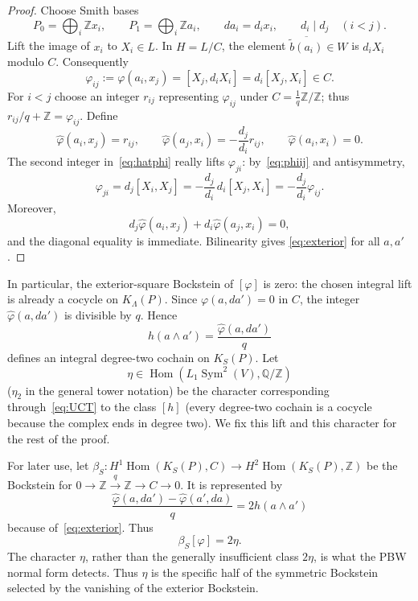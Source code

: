 \documentclass[11pt]{amsart}
\theoremstyle{remark}
\newcommand{\Z}{\mathbb Z}
\newcommand{\Q}{\mathbb Q}
\newcommand{\Sym}{\operatorname{Sym}}
\newcommand{\Hom}{\operatorname{Hom}}
\begin{document}
\begin{proof}
Choose Smith bases
\[
 P_0=\bigoplus_i\Z x_i,
 \qquad P_1=\bigoplus_i\Z a_i,
 \qquad da_i=d_ix_i,
 \qquad d_i\mid d_j\quad(i<j).
\]
Lift the image of $x_i$ to $X_i\in L$.  In $H=L/C$, the element
$\overline{\widetilde b(a_i)}\in W$ is $d_iX_i$ modulo $C$.
Consequently
\begin{equation}\label{eq:phiij}
 \varphi_{ij}:=\varphi(a_i,x_j)
   =[X_j,d_iX_i]=d_i[X_j,X_i]\in C.
\end{equation}
For $i<j$ choose an integer $r_{ij}$ representing $\varphi_{ij}$ under
$C=\frac1q\Z/\Z$; thus
$r_{ij}/q+\Z=\varphi_{ij}$.  Define
\begin{equation}\label{eq:hatphi}
 \widehat\varphi(a_i,x_j)=r_{ij},
 \qquad
 \widehat\varphi(a_j,x_i)=-\frac{d_j}{d_i}r_{ij},
 \qquad
 \widehat\varphi(a_i,x_i)=0.
\end{equation}
The second integer in~\eqref{eq:hatphi} really lifts
$\varphi_{ji}$: by~\eqref{eq:phiij} and antisymmetry,
\[
 \varphi_{ji}=d_j[X_i,X_j]
   =-\frac{d_j}{d_i}\,d_i[X_j,X_i]
   =-\frac{d_j}{d_i}\varphi_{ij}.
\]
Moreover,
\[
 d_j\widehat\varphi(a_i,x_j)
 +d_i\widehat\varphi(a_j,x_i)=0,
 \]
and the diagonal equality is immediate.  Bilinearity gives
\eqref{eq:exterior} for all $a,a'$.
\end{proof}

In particular, the exterior-square Bockstein of $[\varphi]$ is zero:
the chosen integral lift is already a cocycle on $K_\Lambda(P)$.
Since $\varphi(a,da')=0$ in $C$, the integer
$\widehat\varphi(a,da')$ is divisible by $q$.  Hence
\begin{equation}\label{eq:h}
 h(a\wedge a')=\frac{\widehat\varphi(a,da')}{q}
\end{equation}
defines an integral degree-two cochain on $K_S(P)$.  Let
\begin{equation}\label{eq:eta}
 \eta\in\Hom(L_1\Sym^2(V),\Q/\Z)
\end{equation}
($\eta_2$ in the general tower notation) be the character
corresponding through~\eqref{eq:UCT} to the class
$[h]$ (every degree-two cochain is a cocycle because the complex ends
in degree two).  We fix this lift and this character for the rest of
the proof.

For later use, let
$\beta_S:H^1\Hom(K_S(P),C)\to H^2\Hom(K_S(P),\Z)$ be the Bockstein for
$0\to\Z\xrightarrow q\Z\to C\to0$.  It is represented by
\[
 \frac{\widehat\varphi(a,da')-
       \widehat\varphi(a',da)}q
 =2h(a\wedge a')
\]
because of~\eqref{eq:exterior}.  Thus
\begin{equation}\label{eq:twice}
                         \beta_S[\varphi]=2\eta.
\end{equation}
The character $\eta$, rather than the generally insufficient class
$2\eta$, is what the PBW normal form detects.  Thus $\eta$ is the
specific half of the symmetric Bockstein selected by the vanishing of
the exterior Bockstein.
\end{document}
